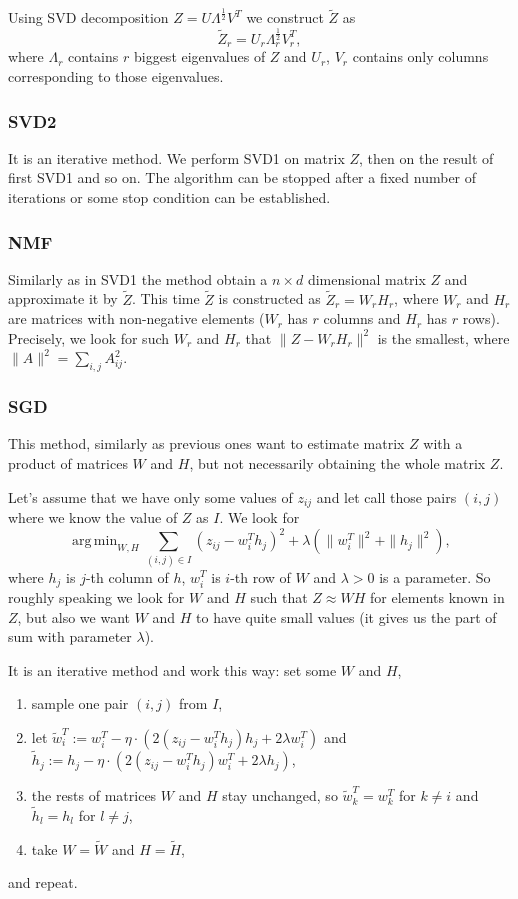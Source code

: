 \documentclass[11pt]{amsart}
\DeclareMathOperator*{\argmin}{arg\,min}
\begin{document}
Using SVD decomposition $Z = U \Lambda^{\frac{1}{2}} V^T$ we construct $\tilde{Z}$ as
\[\tilde{Z}_r = U_r \Lambda_r^{\frac{1}{2}}V_r^T,\]
where $\Lambda_r$ contains $r$ biggest eigenvalues of $Z$ and $U_r$, $V_r$ contains only columns corresponding to those eigenvalues.

\subsubsection*{SVD2}

It is an iterative method.
We perform SVD1 on matrix $Z$, then on the result of first SVD1 and so on.
The algorithm can be stopped after a fixed number of iterations or some stop condition can be established.


\subsubsection*{NMF}

Similarly as in SVD1 the method obtain a $n \times d$ dimensional matrix $Z$ and approximate it by $\tilde{Z}$.
This time $\tilde{Z}$ is constructed as $\tilde{Z}_r = W_r H_r $, where $W_r$ and $H_r$ are matrices with non-negative elements ($W_r$ has $r$ columns and $H_r$ has $r$ rows).
Precisely, we look for such $W_r$ and $H_r$ that $\|Z - W_r H_r \|^2$ is the smallest, where $\|A\|^2 = \sum_{i, j} A_{ij}^2$.

\subsubsection*{SGD}

This method, similarly as previous ones want to estimate matrix $Z$ with a product of matrices
$W$ and $H$, but not necessarily obtaining the whole matrix $Z$.

Let's assume that we have only some values of $z_{ij}$ and let call those pairs $(i,j)$ where we know the value of $Z$ as $I$.
We look for
\[\argmin_{W, H} \sum_{(i,j)\in I} (z_{ij} - w_i^T h_j)^2 + \lambda(\|w_i^T\|^2 + \|h_j\|^2),\]
where $h_j$ is $j$-th column of $h$, $w_i^T$ is $i$-th row of $W$ and $\lambda > 0$ is a parameter.
So roughly speaking we look for $W$ and $H$ such that $Z \approx WH$ for elements known in $Z$, but also we want $W$ and $H$ to have quite small values (it gives us the part of sum with parameter $\lambda$).

It is an iterative method and work this way: set some $W$ and $H$,
\begin{enumerate}
    \item sample one pair $(i,j)$ from $I$,
    \item let $\tilde{w}_i^T := w_i^T - \eta \cdot \left(2(z_{ij} - w_i^T h_j) h_j + 2 \lambda w_i^T \right)$ and $\tilde{h}_j := h_j - \eta \cdot \left(2(z_{ij} - w_i^T  h_{j}) w_i^T + 2 \lambda h_j \right)$,
    \item the rests of matrices $W$ and $H$ stay unchanged, so $\tilde{w}_k^T = w_k^T$ for $k \neq i$ and $\tilde{h}_l = h_l$ for $l \neq j$,
    \item take $W = \tilde{W}$ and $H = \tilde{H}$,
\end{enumerate}
and repeat.
\end{document}
